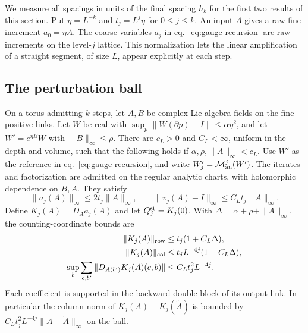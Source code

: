 \documentclass[11pt,letterpaper,reqno]{amsart}
\makeatletter
\numberwithin{equation}{section}
\renewcommand{\eqref}[1]{\textup{eq.~\ref{#1}}}
\theoremstyle{definition}
\newcommand{\ms@minorstart}{%
  \pushQED{\qed}\renewcommand{\qedsymbol}{$\blacksquare$}}
\newenvironment{proposition}[1][]{\ms@minorstart\ms@proposition[#1]}
  {\popQED\endms@proposition}
\theoremstyle{remark}
\makeatother
\begin{document}
We measure all spacings in units of the final spacing \(h_k\) for
the first two results of this section. Put
\(\eta=L^{-k}\) and \(t_j=L^j\eta\) for \(0\leq j\leq k\).
An input \(A\) gives a raw fine increment \(a_0=\eta A\). The
coarse variables \(a_j\) in \eqref{eq:gauge-recursion} are raw
increments on the level-\(j\) lattice. This normalization lets the
linear amplification of a straight segment, of size \(L\), appear
explicitly at each step.

\subsection{The perturbation ball}

\begin{proposition}[Depth-uniform iteration]\label{prop:avg-iteration}
On a torus admitting \(k\) steps, let \(A,B\) be complex Lie
algebra fields on the fine positive links. Let \(W\) be real with
\(\sup_p\|W(\partial p)-I\|\leq\alpha\eta^2\),
and let \(W'=e^{\eta B}W\) with \(\|B\|_\infty\leq\rho\).
There are \(c_L>0\) and \(C_L<\infty\), uniform in the depth and
volume, such that the following holds if
\(\alpha,\rho,\|A\|_\infty<c_L\). Use \(W'\) as the reference in
\eqref{eq:gauge-recursion}, and write \(W'_j=\mathcal M_{\rm an}^j(W')\).
The iterates and factorization are admitted on the regular analytic
charts, with holomorphic dependence on \(B,A\). They satisfy
\begin{equation}
 \|a_j(A)\|_\infty\leq 2t_j\|A\|_\infty,\qquad
 \|v_j(A)-I\|_\infty\leq C_L t_j\|A\|_\infty .
 \label{eq:avg-raw-radii}
\end{equation}
Define \(K_j(A)=D_Aa_j(A)\) and let
\(Q_j^{\rm st}=K_j(0)\). With
\(\Delta=\alpha+\rho+\|A\|_\infty\), the counting-coordinate bounds are
\begin{equation}
 \begin{split}
 \|K_j(A)\|_{\rm row}&\leq t_j(1+C_L\Delta),\\
 \|K_j(A)\|_{\rm col}&\leq t_j L^{-4j}(1+C_L\Delta),\\
 \sup_b\sum_{c,b'}\|D_{A(b')}K_j(A)(c,b)\|
        &\leq C_L t_j^2 L^{-4j}.
 \end{split}
 \label{eq:avg-derivative}
\end{equation}
Each coefficient is supported in the backward double block of its
output link. In particular the column norm of
\(K_j(A)-K_j(\widetilde A)\) is bounded by
\(C_L t_j^2 L^{-4j}\|A-\widetilde A\|_\infty\) on the ball.


\end{proposition}
\end{document}
